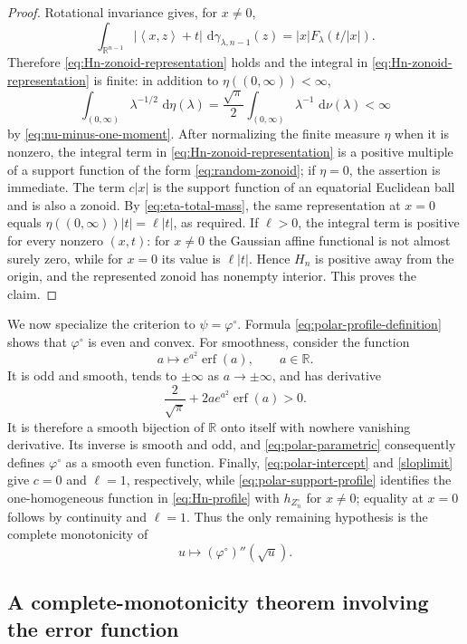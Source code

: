 \documentclass[11pt]{article}
\theoremstyle{definition}
\theoremstyle{remark}
\newcommand{\R}{\mathbb R}
\newcommand{\dd}{\,\mathrm d}
\newcommand{\abs}[1]{\left|#1\right|}
\newcommand{\ip}[2]{\left\langle #1,#2\right\rangle}
\newcommand{\erf}{\operatorname{erf}}
\begin{document}
\begin{proof}
Rotational invariance gives, for $x\neq0$,
\[
 \int_{\R^{n-1}}\abs{\ip{x}{z}+t}\,
 \dd\gamma_{\lambda,n-1}(z)
 =\abs{x}F_\lambda(t/\abs{x}).
\]
Therefore \eqref{eq:Hn-zonoid-representation} holds and the integral in \eqref{eq:Hn-zonoid-representation} is finite: in addition to $\eta((0,\infty))<\infty$,
\[
 \int_{(0,\infty)}\lambda^{-1/2}\,\dd\eta(\lambda)
 =\frac{\sqrt\pi}{2}
 \int_{(0,\infty)}\lambda^{-1}\,\dd\nu(\lambda)<\infty
\]
by \eqref{eq:nu-minus-one-moment}.  After normalizing the
finite measure $\eta$ when it is nonzero, the integral term in
\eqref{eq:Hn-zonoid-representation} is a positive multiple of a
support function of the form \eqref{eq:random-zonoid}; if $\eta=0$,
the assertion is immediate.  The term $c\abs{x}$ is the support function
of an equatorial Euclidean ball and is also a zonoid. By \eqref{eq:eta-total-mass}, the same representation at
$x=0$ equals $\eta((0,\infty))\abs t=\ell\abs t$, as required.  If
$\ell>0$, the integral term is positive for every nonzero $(x,t)$:
for $x\neq0$ the Gaussian affine functional is not almost surely
zero, while for $x=0$ its value is $\ell\abs t$.  Hence $H_n$ is
positive away from the origin, and the represented zonoid has
nonempty interior.  This proves the claim.
\end{proof}

We now specialize the criterion to
$\psi=\varphi^\circ$.  Formula
\eqref{eq:polar-profile-definition} shows that $\varphi^\circ$ is even
and convex.   For smoothness, consider the function
\[
 a\longmapsto e^{a^2}\erf(a),\qquad a\in\R.
\]
It is odd and smooth, tends to $\pm\infty$ as $a\to\pm\infty$, and has
derivative
\[
 \frac2{\sqrt\pi}+2ae^{a^2}\erf(a)>0.
\]
It is therefore a smooth bijection of $\R$ onto itself with nowhere
vanishing derivative.  Its inverse is smooth and odd, and
\eqref{eq:polar-parametric} consequently defines $\varphi^\circ$ as a
smooth even function.  Finally, \eqref{eq:polar-intercept} and
\eqref{sloplimit} give $c=0$ and $\ell=1$,
respectively,  while \eqref{eq:polar-support-profile} identifies the
one-homogeneous function in \eqref{eq:Hn-profile} with
$h_{Z_n^\circ}$ for $x\neq0$; equality at $x=0$ follows by continuity
and $\ell=1$.  Thus the only remaining hypothesis is the complete
monotonicity of
\[
 u\longmapsto(\varphi^\circ)''(\sqrt u).
\]

\subsection{A complete-monotonicity
theorem involving the error function}
\label{sec:complete-monotonicity}
\end{document}
